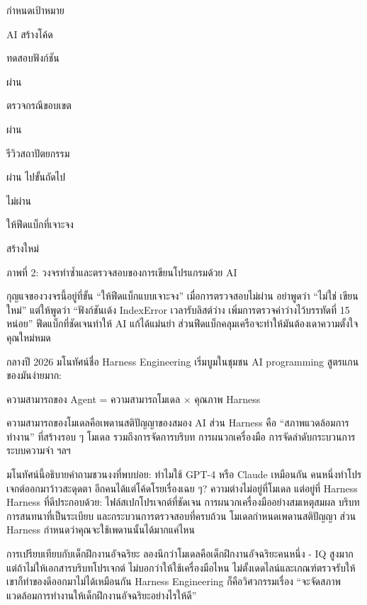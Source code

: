 กำหนดเป้าหมาย

AI สร้างโค้ด

ทดสอบฟังก์ชัน

ผ่าน

ตรวจกรณีขอบเขต

ผ่าน

รีวิวสถาปัตยกรรม

ผ่าน ไปขั้นถัดไป

ไม่ผ่าน

ให้ฟีดแบ็กที่เจาะจง

สร้างใหม่

\begin{center}\small\color{gray}ภาพที่ 2: วงจรทำซ้ำและตรวจสอบของการเขียนโปรแกรมด้วย AI\end{center}

กุญแจของวงจรนี้อยู่ที่ขั้น “ให้ฟีดแบ็กแบบเจาะจง” เมื่อการตรวจสอบไม่ผ่าน อย่าพูดว่า “ไม่ใช่ เขียนใหม่” แต่ให้พูดว่า “ฟังก์ชันเด้ง IndexError เวลารับลิสต์ว่าง เพิ่มการตรวจค่าว่างไว้บรรทัดที่ 15 หน่อย” ฟีดแบ็กที่ชัดเจนทำให้ AI แก้ได้แม่นยำ ส่วนฟีดแบ็กคลุมเครือจะทำให้มันต้องเดาความตั้งใจคุณใหม่หมด


กลางปี 2026 มโนทัศน์ชื่อ Harness Engineering เริ่มบูมในชุมชน AI programming สูตรแกนของมันง่ายมาก:

ความสามารถของ Agent = ความสามารถโมเดล × คุณภาพ Harness

ความสามารถของโมเดลคือเพดานสติปัญญาของสมอง AI ส่วน Harness คือ “สภาพแวดล้อมการทำงาน” ที่สร้างรอบ ๆ โมเดล รวมถึงการจัดการบริบท การผนวกเครื่องมือ การจัดลำดับกระบวนการ ระบบความจำ ฯลฯ

มโนทัศน์นี้อธิบายคำถามชวนงงที่พบบ่อย: ทำไมใช้ GPT-4 หรือ Claude เหมือนกัน คนหนึ่งทำโปรเจกต์ออกมาว้าวสะดุดตา อีกคนได้แต่โค้ดโรยเรื่องเฉย ๆ? ความต่างไม่อยู่ที่โมเดล แต่อยู่ที่ Harness Harness ที่ดีประกอบด้วย: ไฟล์สเปกโปรเจกต์ที่ชัดเจน การผนวกเครื่องมืออย่างสมเหตุสมผล บริบทการสนทนาที่เป็นระเบียบ และกระบวนการตรวจสอบที่ครบถ้วน โมเดลกำหนดเพดานสติปัญญา ส่วน Harness กำหนดว่าคุณจะใช้เพดานนั้นได้มากแค่ไหน

\begin{tcbinfo}{การเปรียบเทียบกับเด็กฝึกงานอัจฉริยะ}
ลองนึกว่าโมเดลคือเด็กฝึกงานอัจฉริยะคนหนึ่ง - IQ สูงมาก แต่ถ้าไม่ให้เอกสารบริบทโปรเจกต์ ไม่บอกว่าให้ใช้เครื่องมือไหน ไม่ตั้งเดดไลน์และเกณฑ์ตรวจรับให้ เขาก็ทำของดีออกมาไม่ได้เหมือนกัน Harness Engineering ก็คือวิศวกรรมเรื่อง “จะจัดสภาพแวดล้อมการทำงานให้เด็กฝึกงานอัจฉริยะอย่างไรให้ดี”

\end{tcbinfo}

